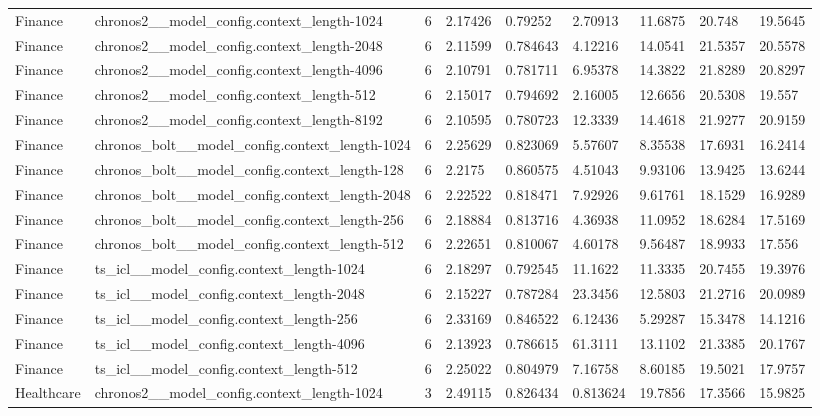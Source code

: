 \begin{tabular}{lllllllll}
Finance & chronos2\_\_model\_config.context\_length-1024 & 6 & 2.17426 & 0.79252 & 2.70913 & 11.6875 & 20.748 & 19.5645 \\
Finance & chronos2\_\_model\_config.context\_length-2048 & 6 & 2.11599 & 0.784643 & 4.12216 & 14.0541 & 21.5357 & 20.5578 \\
Finance & chronos2\_\_model\_config.context\_length-4096 & 6 & 2.10791 & 0.781711 & 6.95378 & 14.3822 & 21.8289 & 20.8297 \\
Finance & chronos2\_\_model\_config.context\_length-512 & 6 & 2.15017 & 0.794692 & 2.16005 & 12.6656 & 20.5308 & 19.557 \\
Finance & chronos2\_\_model\_config.context\_length-8192 & 6 & 2.10595 & 0.780723 & 12.3339 & 14.4618 & 21.9277 & 20.9159 \\
Finance & chronos\_bolt\_\_model\_config.context\_length-1024 & 6 & 2.25629 & 0.823069 & 5.57607 & 8.35538 & 17.6931 & 16.2414 \\
Finance & chronos\_bolt\_\_model\_config.context\_length-128 & 6 & 2.2175 & 0.860575 & 4.51043 & 9.93106 & 13.9425 & 13.6244 \\
Finance & chronos\_bolt\_\_model\_config.context\_length-2048 & 6 & 2.22522 & 0.818471 & 7.92926 & 9.61761 & 18.1529 & 16.9289 \\
Finance & chronos\_bolt\_\_model\_config.context\_length-256 & 6 & 2.18884 & 0.813716 & 4.36938 & 11.0952 & 18.6284 & 17.5169 \\
Finance & chronos\_bolt\_\_model\_config.context\_length-512 & 6 & 2.22651 & 0.810067 & 4.60178 & 9.56487 & 18.9933 & 17.556 \\
Finance & ts\_icl\_\_model\_config.context\_length-1024 & 6 & 2.18297 & 0.792545 & 11.1622 & 11.3335 & 20.7455 & 19.3976 \\
Finance & ts\_icl\_\_model\_config.context\_length-2048 & 6 & 2.15227 & 0.787284 & 23.3456 & 12.5803 & 21.2716 & 20.0989 \\
Finance & ts\_icl\_\_model\_config.context\_length-256 & 6 & 2.33169 & 0.846522 & 6.12436 & 5.29287 & 15.3478 & 14.1216 \\
Finance & ts\_icl\_\_model\_config.context\_length-4096 & 6 & 2.13923 & 0.786615 & 61.3111 & 13.1102 & 21.3385 & 20.1767 \\
Finance & ts\_icl\_\_model\_config.context\_length-512 & 6 & 2.25022 & 0.804979 & 7.16758 & 8.60185 & 19.5021 & 17.9757 \\
Healthcare & chronos2\_\_model\_config.context\_length-1024 & 3 & 2.49115 & 0.826434 & 0.813624 & 19.7856 & 17.3566 & 15.9825 \\

\end{tabular}
